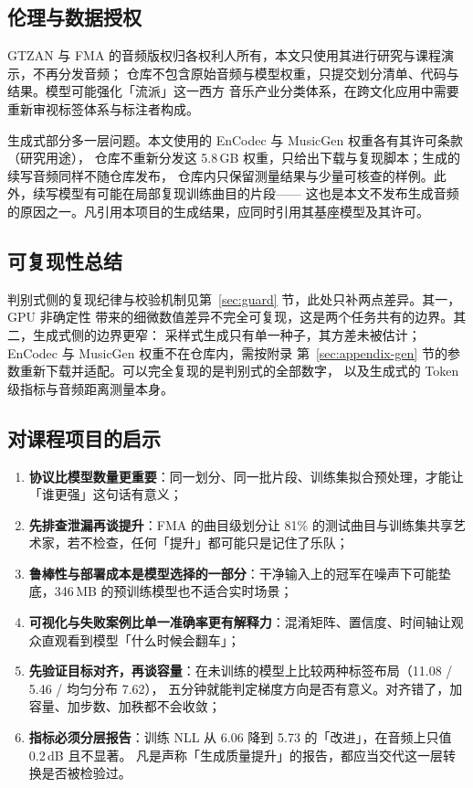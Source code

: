 \documentclass[UTF8,10pt,a4paper]{ctexart}
\begin{document}
\subsection{伦理与数据授权}

GTZAN 与 FMA 的音频版权归各权利人所有，本文只使用其进行研究与课程演示，不再分发音频；
仓库不包含原始音频与模型权重，只提交划分清单、代码与结果。模型可能强化「流派」这一西方
音乐产业分类体系，在跨文化应用中需要重新审视标签体系与标注者构成。

生成式部分多一层问题。本文使用的 EnCodec 与 MusicGen 权重各有其许可条款（研究用途），
仓库不重新分发这 5.8\,GB 权重，只给出下载与复现脚本；生成的续写音频同样不随仓库发布，
仓库内只保留测量结果与少量可核查的样例。此外，续写模型有可能在局部复现训练曲目的片段——
这也是本文不发布生成音频的原因之一。凡引用本项目的生成结果，应同时引用其基座模型及其许可。

\subsection{可复现性总结}

判别式侧的复现纪律与校验机制见第~\ref{sec:guard} 节，此处只补两点差异。其一，GPU 非确定性
带来的细微数值差异不完全可复现，这是两个任务共有的边界。其二，生成式侧的边界更窄：
采样式生成只有单一种子，其方差未被估计；EnCodec 与 MusicGen 权重不在仓库内，需按附录
第~\ref{sec:appendix-gen} 节的参数重新下载并适配。可以完全复现的是判别式的全部数字，
以及生成式的 Token 级指标与音频距离测量本身。

\subsection{对课程项目的启示}
\begin{enumerate}
  \item \textbf{协议比模型数量更重要}：同一划分、同一批片段、训练集拟合预处理，才能让「谁更强」这句话有意义；
  \item \textbf{先排查泄漏再谈提升}：FMA 的曲目级划分让 81\% 的测试曲目与训练集共享艺术家，若不检查，任何「提升」都可能只是记住了乐队；
  \item \textbf{鲁棒性与部署成本是模型选择的一部分}：干净输入上的冠军在噪声下可能垫底，346\,MB 的预训练模型也不适合实时场景；
  \item \textbf{可视化与失败案例比单一准确率更有解释力}：混淆矩阵、置信度、时间轴让观众直观看到模型「什么时候会翻车」；
  \item \textbf{先验证目标对齐，再谈容量}：在未训练的模型上比较两种标签布局（11.08 / 5.46 / 均匀分布 7.62），
  五分钟就能判定梯度方向是否有意义。对齐错了，加容量、加步数、加秩都不会收敛；
  \item \textbf{指标必须分层报告}：训练 NLL 从 6.06 降到 5.73 的「改进」，在音频上只值 0.2\,dB 且不显著。
  凡是声称「生成质量提升」的报告，都应当交代这一层转换是否被检验过。
\end{enumerate}
\end{document}
